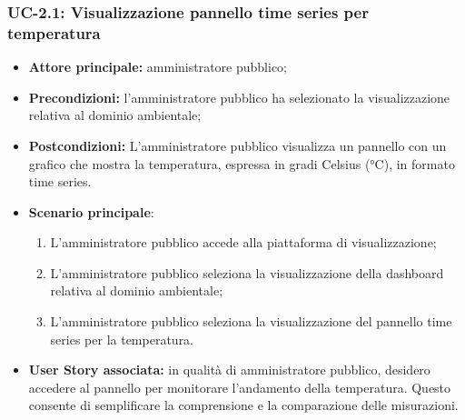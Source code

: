 \documentclass[8pt]{article}
\begin{document}
\subsubsection*{UC-2.1: Visualizzazione pannello time series per temperatura}
\begin{itemize}
    \item \textbf{Attore principale:} amministratore pubblico;
    \item \textbf{Precondizioni: }l’amministratore pubblico ha selezionato la visualizzazione
        relativa al dominio ambientale;
    \item \textbf{Postcondizioni:} L’amministratore pubblico visualizza un pannello con un grafico che mostra la temperatura, espressa in gradi Celsius (°C), in formato time series.
    \item \textbf{Scenario principale}:
    \begin{enumerate}
    \item L’amministratore pubblico accede alla piattaforma di visualizzazione;
    \item L’amministratore pubblico seleziona la visualizzazione della dashboard relativa al dominio
        ambientale;
    \item L’amministratore pubblico seleziona la visualizzazione del pannello time series per la
        temperatura.
    \end{enumerate}
\item \textbf{User Story associata:} in qualità di amministratore pubblico, desidero accedere al
        pannello per monitorare l'andamento della temperatura. Questo consente di semplificare la comprensione e la comparazione delle misurazioni.
\end{itemize}
\end{document}
